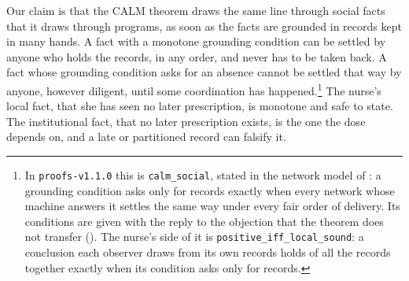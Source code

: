 Our claim is that the CALM theorem draws the same line through social facts that it draws through
programs, as soon as the facts are grounded in records kept in many hands. A fact with a monotone
grounding condition can be settled by anyone who holds the records, in any order, and never has to
be taken back. A fact whose grounding condition asks for an absence cannot be settled that way by
anyone, however diligent, until some coordination has happened.\footnote{In \texttt{proofs-v1.1.0}
this is \texttt{calm\_social}, stated in the network model of \citet{karna2026}: a grounding
condition asks only for records exactly when every network whose machine answers it settles the
same way under every fair order of delivery. Its conditions are given with the reply to the
objection that the theorem does not transfer (). The nurse's side of it is
\texttt{positive\_iff\_local\_sound}: a conclusion each observer draws from its own records holds of
all the records together exactly when its condition asks only for records.} The nurse's local fact, that she has
seen no later prescription, is monotone and safe to state. The institutional fact, that no later
prescription exists, is the one the dose depends on, and a late or partitioned record can falsify
it.
